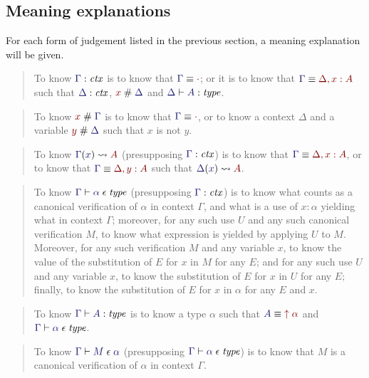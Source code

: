 \documentclass[main.tex]{subfiles}
\begin{document}
\subsection{Meaning explanations}

For each form of judgement listed in the previous section, a meaning
explanation will be given.

\begin{quote}
  To know $\lfctx\Gamma$ is to know that $\match{\Gamma}{\cdot}$; or it is
to know that $\match{\Gamma}{\Delta,x:A}$ such that $\lfctx\Delta$, $\fresh{x}{\Delta}$ and
$\lfsequent\Delta\type{A}$.
\end{quote}\medskip

\begin{quote}
  To know $\fresh{x}{\Gamma}$ is to know that $\match\Gamma\cdot$, or
to know a context $\Delta$ and a variable $\fresh{y}{\Delta}$ such
that $x$ is not $y$.
\end{quote}\medskip

\begin{quote}
  To know $\hasvar{\Gamma}{x}{A}$ (presupposing $\lfctx\Gamma$) is to
know that $\match{\Gamma}{\Delta,x:A}$, or to know that
$\match{\Gamma}{\Delta, y:A}$ such that $\hasvar{\Delta}{x}{A}$.
\end{quote}\medskip

\begin{quote}
  To know $\lfsequent\Gamma\cantype{\alpha}$ (presupposing $\lfctx\Gamma$) is
to know what counts as a canonical verification of $\alpha$ in context
$\Gamma$, and what is a use of $x:\alpha$ yielding what in context
$\Gamma$; moreover, for any such use $U$ and any such canonical
verification $M$, to know what expression is yielded by applying $U$
to $M$. Moreover, for any such verification $M$ and any variable $x$,
to know the value of the substitution of $E$ for $x$ in $M$ for any
$E$; and for any such use $U$ and any variable $x$, to know the
substitution of $E$ for $x$ in $U$ for any $E$; finally, to know the
substitution of $E$ for $x$ in $\alpha$ for any $E$ and $x$.
\end{quote}\medskip

\begin{quote}
  To know $\lfsequent\Gamma\type{A}$ is to know a type $\alpha$ such that $\match{A}{\ival{\alpha}}$ and $\lfsequent\Gamma\cantype\alpha$.
\end{quote}\medskip

\begin{quote}
  To know $\lfsequent\Gamma\valof{M}{\alpha}$ (presupposing
$\lfsequent\Gamma\cantype{\alpha}$) is to know that $M$ is a canonical
verification of $\alpha$ in context $\Gamma$.
\end{quote}\medskip
\end{document}

